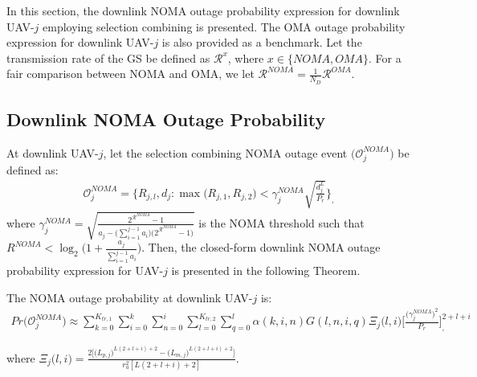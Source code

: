 In this section, the downlink NOMA outage probability expression for downlink UAV-$j$ employing selection combining is presented. The OMA outage probability expression for downlink UAV-$j$ is also provided as a benchmark. Let the transmission rate of the GS be defined as $\mathcal{R}^{x}$, where $x \in \{NOMA, OMA\}$. For a fair comparison between NOMA and OMA, we let $\mathcal{R}^{NOMA}=\frac{1}{N_D}\mathcal{R}^{OMA}$.

\subsection{Downlink NOMA Outage Probability}

At downlink UAV-$j$, let the selection combining NOMA outage event $\big(\mathcal{O}_{j}^{NOMA}\big)$ be defined as:
\begin{eqnarray}
\mathcal{O}_{j}^{NOMA} = \Bigg\{ R_{j,l}, d_{j} : \max\big(R_{j,1},R_{j,2}\big) < \gamma_j^{NOMA} \sqrt{\frac{d_{j}^{L}}{P_r}}\Bigg\}_,
\end{eqnarray}
where $\gamma_j^{NOMA} = \sqrt{\frac{2^{\mathcal{R}^{NOMA}}-1}{a_{j} - \big(\sum_{i=1}^{j-1} a_i\big)\big(2^{\mathcal{R}^{NOMA}}-1\big)}}$ is the NOMA threshold such that $R^{NOMA} < \log_2\bigg(1 + \frac{a_{j}}{\sum_{i=1}^{j-1} a_i}\bigg)$. Then, the closed-form downlink NOMA outage probability expression for UAV-$j$ is presented in the following Theorem.

\begin{theorem} \label{NOMA_bivariate_Rician_Shadowed_theorem_P_out_down_uav}
The NOMA outage probability at downlink UAV-$j$ is:
\begin{eqnarray}
Pr\big(\mathcal{O}_{j}^{NOMA}\big) \approx \sum_{k=0}^{K_{tr,1}} \sum_{i=0}^{k} \sum_{n=0}^{i} \sum_{l=0}^{K_{tr,2}} \sum_{q=0}^{l} \alpha(k,i,n) G(l,n,i,q) \Xi_j\big(l,i\big) \Bigg[\frac{\big(\gamma_j^{NOMA}\big)^2}{P_r}\Bigg]^{2+l+i}_, \label{NOMA_bivariate_Rician_Shadowed_P_out_down_uav_j}
\end{eqnarray}
\end{theorem}
where $\Xi_j\big(l,i\big) = \frac{2 \big[ \big(L_{p,j}\big)^{L(2+l+i)+2} - \big(L_{m,j}\big)^{L(2+l+i)+2} \big]}{r_a^2[L(2+l+i)+2]}$.

